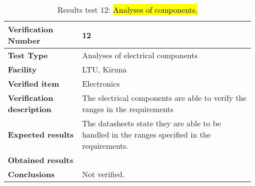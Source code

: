 \begin{table}[H]
\centering

\begin{tabular}{|m{}| m{} |}
\hline
\textbf{Verification Number} 		& 12 					\\ \hline
\textbf{Test Type} 					& Analyses of electrical components		\\ \hline
\textbf{Facility} 					& LTU, Kiruna \\ \hline
\textbf{Verified item} 				& Electronics \\ \hline

\textbf{Verification description} 	& The electrical components are able to verify the ranges in the requirements \\ \hline

\textbf{Expected results} 			& The datasheets state they are able to be handled in the ranges specified in the requirements. \\ \hline

\textbf{Obtained results} 			& \\ \hline

\textbf{Conclusions} 				& Not verified.		\\ \hline
\end{tabular}
\caption{Results test 12: \hl{Analyses of components.}}
\label{tab:testresult12:components}
\end{table}


\raggedbottom
